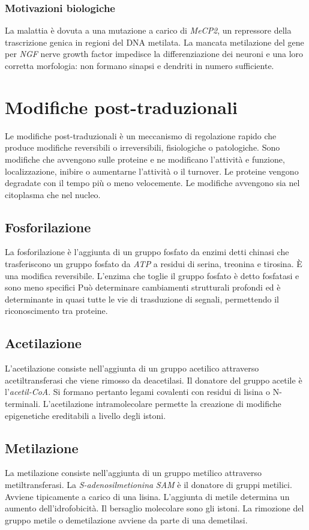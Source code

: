 		\subsubsection{Motivazioni biologiche}
		La malattia \`e dovuta a una mutazione a carico di \emph{MeCP2}, un repressore della trascrizione genica in regioni del DNA metilata.
		La mancata metilazione del gene per \emph{NGF} nerve growth factor impedisce la differenziazione dei neuroni e una loro corretta morfologia: non formano sinapsi e dendriti in numero sufficiente.

\section{Modifiche post-traduzionali}
Le modifiche post-traduzionali \`e un meccanismo di regolazione rapido che produce modifiche reversibili o irreversibili, fisiologiche o patologiche.
Sono modifiche che avvengono sulle proteine e ne modificano l'attivit\`a e funzione, localizzazione, inibire o aumentarne l'attivit\`a o il turnover. 
Le proteine vengono degradate con il tempo pi\`u o meno velocemente.
Le modifiche avvengono sia nel citoplasma che nel nucleo.

	\subsection{Fosforilazione}
	La fosforilazione \`e l'aggiunta di un gruppo fosfato da enzimi detti chinasi che trasferiscono un gruppo fosfato da \emph{ATP} a residui di serina, treonina e tirosina.
	\`E una modifica reversibile. 
	L'enzima che toglie il gruppo fosfato \`e detto fosfatasi e sono meno specifici
	Pu\`o determinare cambiamenti strutturali profondi ed \`e determinante in quasi tutte le vie di trasduzione di segnali, permettendo il riconoscimento tra proteine.

	\subsection{Acetilazione}
	L'acetilazione consiste nell'aggiunta di un gruppo acetilico attraverso acetiltransferasi che viene rimosso da deacetilasi. 
	Il donatore del gruppo acetile \`e l'\emph{acetil-CoA}.
	Si formano pertanto legami covalenti con residui di lisina o N-terminali.
	L'acetilazione intramolecolare permette la creazione di modifiche epigenetiche ereditabili a livello degli istoni.


	\subsection{Metilazione}
	La metilazione consiste nell'aggiunta di un gruppo metilico attraverso metiltransferasi.
	La \emph{S-adenosilmetionina} \emph{SAM} \`e il donatore di gruppi metilici.
	Avviene tipicamente a carico di una lisina.
	L'aggiunta di metile determina un aumento dell'idrofobicit\`a.
	Il bersaglio molecolare sono gli istoni.
	La rimozione del gruppo metile o demetilazione avviene da parte di una demetilasi.

